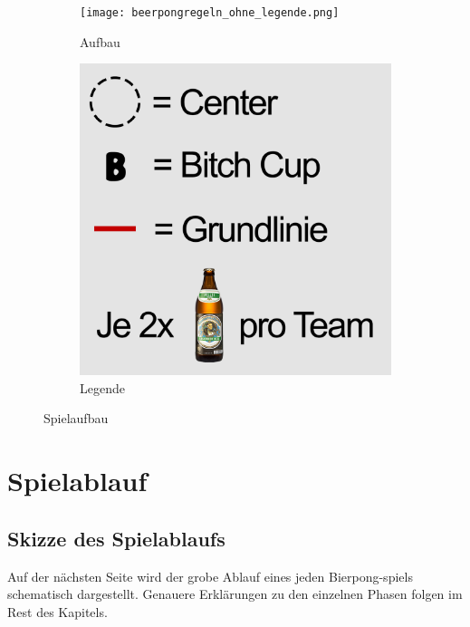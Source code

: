 \documentclass[a5paper, 12pt]{book}
\begin{document}
\begin{figure}
    \centering
    \begin{subfigure}[h]{0.69\textwidth}
    \centering
    \texttt{[image: beerpongregeln\_ohne\_legende.png]}
    \caption{Aufbau}
    \end{subfigure}
    \hfill
   \begin{subfigure}[h]{0.29\textwidth}
   \centering
\includegraphics[width=\textwidth]{legende.png}
\caption{Legende}
   \end{subfigure}
    \caption{Spielaufbau}
    \label{fig:spielaufbau}
\end{figure}

\chapter{Spielablauf}
\section{Skizze des Spielablaufs}
Auf der nächsten Seite wird der grobe Ablauf eines jeden Bierpong-spiels schematisch dargestellt. Genauere Erklärungen zu den einzelnen Phasen folgen im Rest des Kapitels.
\end{document}
